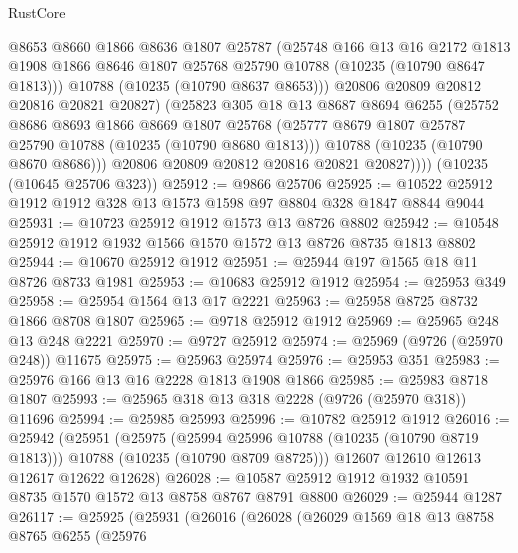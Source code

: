 \begin{lexlean}{RustCore}
\begin{coremodule}
              @8653
              @8660
              @1866
              @8636
              @1807
              @25787
              (@25748
                @166
                @13
                @16
                @2172
                @1813
                @1908
                @1866
                @8646
                @1807
                @25768
                @25790
                @10788
                (@10235 (@10790 @8647 @1813)))
              @10788
              (@10235 (@10790 @8637 @8653)))
            @20806
            @20809
            @20812
            @20816
            @20821
            @20827)
          (@25823
            @305
            @18
            @13
            @8687
            @8694
            @6255
            (@25752
              @8686
              @8693
              @1866
              @8669
              @1807
              @25768
              (@25777 @8679 @1807 @25787 @25790 @10788 (@10235 (@10790 @8680 @1813)))
              @10788
              (@10235 (@10790 @8670 @8686)))
            @20806
            @20809
            @20812
            @20816
            @20821
            @20827))))
    (@10235 (@10645 @25706 @323))
@25912 := @9866 @25706
@25925 := @10522 @25912 @1912 @1912 @328 @13 @1573 @1598 @97 @8804 @328 @1847 @8844 @9044
@25931 := @10723 @25912 @1912 @1573 @13 @8726 @8802
@25942 := @10548 @25912 @1912 @1932 @1566 @1570 @1572 @13 @8726 @8735 @1813 @8802
@25944 := @10670 @25912 @1912
@25951 := @25944 @197 @1565 @18 @11 @8726 @8733 @1981
@25953 := @10683 @25912 @1912
@25954 := @25953 @349
@25958 := @25954 @1564 @13 @17 @2221
@25963 := @25958 @8725 @8732 @1866 @8708 @1807
@25965 := @9718 @25912 @1912
@25969 := @25965 @248 @13 @248 @2221
@25970 := @9727 @25912
@25974 := @25969 (@9726 (@25970 @248)) @11675
@25975 := @25963 @25974
@25976 := @25953 @351
@25983 := @25976 @166 @13 @16 @2228 @1813 @1908 @1866
@25985 := @25983 @8718 @1807
@25993 := @25965 @318 @13 @318 @2228 (@9726 (@25970 @318)) @11696
@25994 := @25985 @25993
@25996 := @10782 @25912 @1912
@26016 := @25942
    (@25951
      (@25975
        (@25994 @25996 @10788 (@10235 (@10790 @8719 @1813)))
        @10788
        (@10235 (@10790 @8709 @8725)))
      @12607
      @12610
      @12613
      @12617
      @12622
      @12628)
@26028 := @10587 @25912 @1912 @1932 @10591 @8735 @1570 @1572 @13 @8758 @8767 @8791 @8800
@26029 := @25944 @1287
@26117 := @25925
    (@25931
      (@26016
        (@26028
          (@26029
            @1569
            @18
            @13
            @8758
            @8765
            @6255
            (@25976

\end{coremodule}
\end{lexlean}
